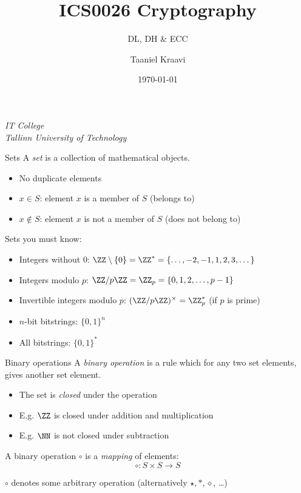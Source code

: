 \graphicspath{ {../../images/} }
\usetikzlibrary{external}

\usepackage{pgfplots}

\title{ICS0026 Cryptography}
\subtitle{DL, DH \& ECC}
\date{\today}
\author{Taaniel Kraavi}
\institute%
{%
  \textit{IT College}\\
  \textit{Tallinn University of Technology}
}


\begin{frame}
  \titlepage
\end{frame}

\begin{frame}{Sets}
  A \emph{set} is a collection of mathematical objects.
  \begin{itemize}[<+(1)->]
    \item No duplicate elements
    \item $x\in S$: element $x$ is a member of $S$ (belongs to)
    \item $x\notin S$: element $x$ is not a member of $S$ (does not belong to)
  \end{itemize}

  \pause
  Sets you must know:
  \begin{itemize}[<+(1)->]
    \item Integers without $0$: $\ZZ\setminus\{0\}=\ZZ^*=\{\dots, -2, -1, 1, 2, 3, \dots\}$
    \item Integers modulo $p$: $\ZZ/p\ZZ = \ZZ_p = \{0, 1, 2, \dots, p-1\}$
    \item Invertible integers modulo $p$: $(\ZZ/p\ZZ)^\times = \ZZ_p^*$ (if $p$ is prime)
    \item $n$-bit bitstrings: $\{0, 1\}^n$
    \item All bitstrings: $\{0, 1\}^*$
  \end{itemize}
\end{frame}

\begin{frame}{Binary operations}
  A \emph{binary operation} is a rule which for any two set elements, gives another set element.
  \begin{itemize}[<+(1)->]
    \item The set is \emph{closed} under the operation
    \item E.g. $\ZZ$ is closed under addition and multiplication
    \item E.g. $\NN$ is not closed under subtraction
  \end{itemize}

  \pause
  A binary operation $\circ$ is a \emph{mapping} of elements:
  \[
    \circ: S \times S \to S
  \]

  \pause
  $\circ$ denotes some arbitrary operation (alternatively $\star, \ast, \diamond$, \dots)
\end{frame}


